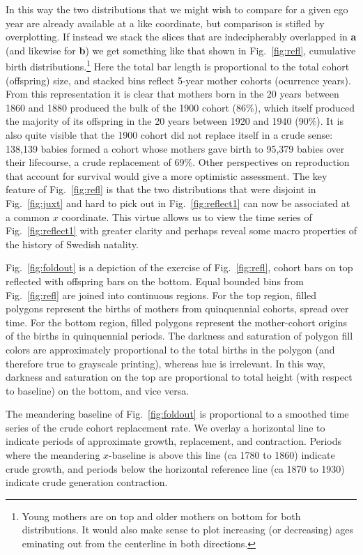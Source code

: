 \documentclass{article}
\begin{document}
In this way the two distributions that we might wish to compare for a given ego year are already available at a like coordinate, but comparison is stifled by overplotting. If instead we stack the slices that are indecipherably overlapped in \textbf{a} (and likewise for \textbf{b}) we get something like that shown in Fig.~\ref{fig:refl}, cumulative birth distributions.\footnote{Young mothers are on top and older mothers on bottom for both distributions. It would also make sense to plot increasing (or decreasing) ages eminating out from the centerline in both directions.} Here the total bar length is proportional to the total cohort (offspring) size, and stacked bins reflect 5-year mother cohorts (ocurrence years). From this representation it is clear that mothers born in the 20 years between 1860 and 1880 produced the bulk of the 1900 cohort (86\%), which itself produced the majority of its offspring in the 20 years between 1920 and 1940 (90\%). It is also quite visible that the 1900 cohort did not replace itself in a crude sense: 138,139 babies formed a cohort whose mothers gave birth to 95,379 babies over their lifecourse, a crude replacement of 69\%. Other perspectives on reproduction that account for survival would give a more optimistic assessment. The key feature of Fig.~\ref{fig:refl} is that the two distributions that were disjoint in Fig.~\ref{fig:juxt} and hard to pick out in Fig.~\ref{fig:reflect1} can now be associated at a common $x$ coordinate. This virtue allows us to view the time series of Fig.~\ref{fig:reflect1} with greater clarity and perhaps reveal some macro properties of the history of Swedish natality.

Fig.~\ref{fig:foldout} is a depiction of the exercise of Fig.~\ref{fig:refl}, cohort bars on top reflected with offspring bars on the bottom. Equal bounded bins from Fig.~\ref{fig:refl} are joined into continuous regions. For the top region, filled polygons represent the births of mothers from quinquennial cohorts, spread over time. For the bottom region, filled polygons represent the mother-cohort origins of the births in quinquennial periods. The darkness and saturation of polygon fill colors are approximately proportional to the total births in the polygon (and therefore true to grayscale printing), whereas hue is irrelevant. In this way, darkness and saturation on the top are proportional to total height (with respect to baseline) on the bottom, and vice versa. 

The meandering baseline of Fig.~\ref{fig:foldout} is proportional to a smoothed time series of the crude cohort replacement rate. We overlay a horizontal line to indicate periods of approximate growth, replacement, and contraction. Periods where the meandering $x$-baseline is above this line (ca 1780 to 1860) indicate crude growth, and periods below the horizontal reference line (ca 1870 to 1930) indicate crude generation contraction. 
\end{document}
